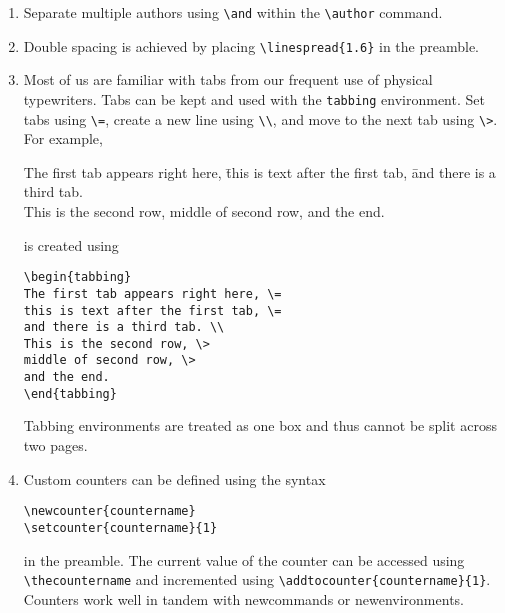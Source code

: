 \documentclass[12pt]{paper}
\begin{document}
\begin{enumerate}
Sometimes when using commands such as \verb~\hfill~, an empty box is needed to get
spacing just right; create such an empty box with \verb~\mbox{}~.

On a similar note, \verb!~! is a non-breaking space character, used when a space between two 
words or characters should appear but those words cannot be on different lines.

\item Separate multiple authors using \verb~\and~ within the \verb~\author~ command.

\item Double spacing is achieved by placing \verb~\linespread{1.6}~ in the preamble.

\item Most of us are familiar with tabs from our frequent use of physical typewriters. 
Tabs can be kept and used with the \verb~tabbing~ environment.  Set tabs using \verb~\=~, 
create a new line using \verb~\\~, and move to the next tab using \verb~\>~.  For example,
\begin{tabbing}
The first tab appears right here, \= this is text after the first tab, \= and there is a third tab.
\\
This is the second row, \>  middle of second row, \> and the end.
\end{tabbing}
is created using
\begin{lstlisting}
\begin{tabbing}
The first tab appears right here, \= 
this is text after the first tab, \= 
and there is a third tab. \\
This is the second row, \>  
middle of second row, \> 
and the end.
\end{tabbing}
\end{lstlisting}
Tabbing environments are treated as one box and thus cannot be split across two pages.

\item Custom counters can be defined using the syntax 
\begin{lstlisting}
\newcounter{countername}
\setcounter{countername}{1}
\end{lstlisting}
in the preamble. The current value of the counter can be accessed using 
\verb~\thecountername~ and incremented using \verb~\addtocounter{countername}{1}~.
Counters work well in tandem with newcommands or newenvironments. 
\end{enumerate}
\end{document}
